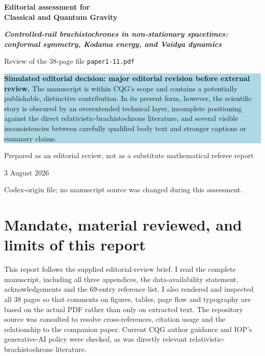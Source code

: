 \documentclass[11pt,a4paper]{article}
\newcommand{\manuscript}{\emph{Controlled-rail brachistochrones in non-stationary spacetimes: conformal symmetry, Kodama energy, and Vaidya dynamics}}
\begin{document}
\hypersetup{pageanchor=false}

\begin{titlepage}
  \centering
  \vspace*{2.0cm}
  {\Large\bfseries Editorial assessment for\\[0.4em] Classical and Quantum Gravity\par}
  \vspace{1.5cm}
  {\LARGE\bfseries \manuscript\par}
  \vspace{1.1cm}
  {\large Review of the 38-page file \texttt{paper1-11.pdf}\par}
  \vspace{1.8cm}
  \begin{minipage}{0.84\textwidth}
    \colorbox{LightBlue}{\parbox{0.94\textwidth}{
      \textbf{Simulated editorial decision: major editorial revision before external review.}
      The manuscript is within CQG's scope and contains a potentially publishable,
      distinctive contribution.  In its present form, however, the scientific story is
      obscured by an overextended technical layer, incomplete positioning against the direct
      relativistic-brachistochrone literature, and several visible inconsistencies between
      carefully qualified body text and stronger captions or summary claims.
    }}
  \end{minipage}
  \vfill
  {\large Prepared as an editorial review, not as a substitute mathematical referee report\par}
  \vspace{0.4cm}
  {\large 3 August 2026\par}
  \vspace{1.3cm}
  {\small Codex-origin file; no manuscript source was changed during this assessment.\par}
\end{titlepage}
\hypersetup{pageanchor=true}

\tableofcontents
\clearpage
{}

\section{Mandate, material reviewed, and limits of this report}

This report follows the supplied editorial-review brief.  I read the complete manuscript,
including all three appendices, the data-availability statement, acknowledgements and the
69-entry reference list.  I also rendered and inspected all 38 pages so that comments on
figures, tables, page flow and typography are based on the actual PDF rather than only on
extracted text.  The repository source was consulted to resolve cross-references, citation
usage and the relationship to the companion paper.  Current CQG author guidance and IOP's
generative-AI policy were checked, as was directly relevant relativistic-brachistochrone
literature.
\end{document}
